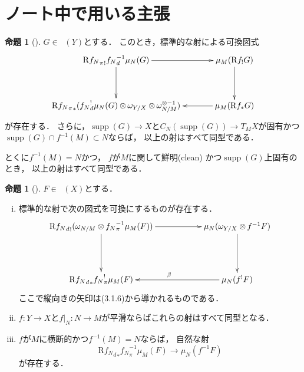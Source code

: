 \documentclass[leqno, 10pt, a4paper, dvipdfmx]{jsarticle}
\theoremstyle{definition}
\numberwithin{equation}{section}
\newcommand{\supp}{\mathop{\mathrm{supp}}\nolimits}
\newcommand{\Dompb}{\mathop{\mathsf{D}^\mathrm{b}}\nolimits}
\newcommand{\Rder}{\mathrm{R}}
\newcommand{\tens}[1][]{\mathbin{\otimes_{\raise1.5ex\hbox to-.1em{}{#1}}}}
\newcommand{\mres}[2][]{{\left.{#1}\right\rvert}_{#2}}
\theoremstyle{mystyle}
\newtheorem{PRP}[AXM]{命題}
\renewenvironment{leftbar}{%
  \def\FrameCommand{\textcolor{lightgray}{\vrule width 4pt} \hspace{10pt}}%
  \MakeFramed {\advance\hsize-\width \FrameRestore}}%
{\endMakeFramed}
\newcommand{\mpb}[1][]{{#1}_{\pi}} %
\newcommand{\mdiff}[1][]{{#1}_{d}} %
\begin{document}
\section{ノート中で用いる主張}
\begin{leftbar}
\begin{PRP}[{\cite[Prop.4.3.4]{KS90}}]\label{prp4.3.4}
  \(G\in\Dompb(Y)\)とする．
  このとき，標準的な射による可換図式    
  \[    
      \vcenter{\xymatrix@C=36pt@R=36pt{
      \Rder{{\mpb[f_{N}]}_{!}}{\mdiff[f_{N}]^{-1}}\mu_{N}(G)
      \ar[d]
      \ar[r]
      &
      \mu_{M}(\Rder{f_{!}}G)
      \ar[d]
      \\
      \Rder{{\mpb[f_{N}]}_{\ast}}({\mdiff[f_{N}]^{!}}\mu_{N}(G)\tens[]\omega_{Y/X}\tens[]\omega_{N/M}^{\otimes{-1}})
      &
      \mu_{M}(\Rder{f_{\ast}}G)
      \ar[l]
      }}
  \]が存在する．
  さらに，\(\supp(G)\to X\)と\(
      C_N(\supp(G))\to T_{M}X
  \)が固有かつ\(\supp(G)\cap f^{-1}(M)\subset N\)ならば，
  以上の射はすべて同型である．
  
  とくに\(f^{-1}(M)=N\)かつ，
  \(f\)が\(M\)に関して鮮明\footnotemark[2] (clean) かつ\(\supp(G)\)上固有のとき，
  以上の射はすべて同型である．
\end{PRP}
\end{leftbar}
\begin{leftbar}
\begin{PRP}[{\cite[Prop.4.3.5]{KS90}}]\label{prp4.3.5}
  \(F\in\Dompb(X)\)とする．
  \begin{enumerate}[(i)]
      \item 標準的な射で次の図式を可換にするものが存在する．
      \[\vcenter{\xymatrix@C=56pt@R=46pt{
          \Rder{{\mdiff[f_N]}_{!}}(\omega_{N/M}\tens[]{\mpb[f_N]^{-1}}\mu_{M}(F))
          \ar[d]^{}
          \ar[r]_{}
          &
          \mu_{N}(\omega_{Y/X}\tens[]{f^{-1}}F)
          \ar[d]
          \\
          \Rder{{\mdiff[f_N]}_{\ast}}{\mpb[f_N]^{!}}\mu_{M}(F)
          &
          \mu_{N}({f^{!}}F)
          \ar[l]_{\beta}
      }}\]
      ここで縦向きの矢印は(3.1.6)から導かれるものである．
      \item \(f\colon Y\to X\)と\(\mres[f]{N}\colon N\to M\)が平滑ならばこれらの射はすべて同型となる．    
      \item \(f\)が\(M\)に横断的かつ\(f^{-1}(M)=N\)ならば，
      自然な射\[
          \Rder{{\mdiff[f_N]}_{\ast}}\mpb[f_N]^{-1}\mu_{M}(F)
          \to \mu_{N}(f^{-1}F)
      \]が存在する．
  \end{enumerate}
\end{PRP}
\end{leftbar}
\end{document}
